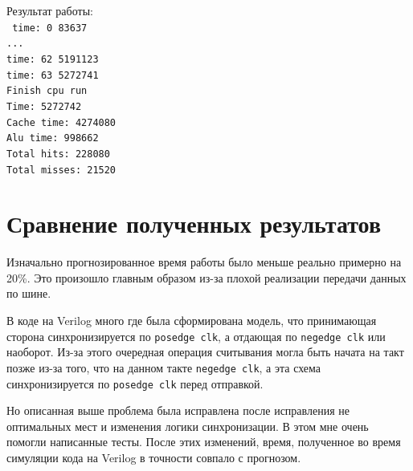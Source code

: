 \documentclass[14pt, russian, onesize]{extreport}
\begin{document}

Результат работы:\\
\texttt{
time:           0                83637\\
...\\
time:          62              5191123\\
time:          63              5272741\\
Finish cpu run                        \\
Time:              5272742            \\
Cache time:              4274080      \\
Alu time:               998662        \\
Total hits:      228080               \\
Total misses:       21520             \\
}

\section*{ Сравнение полученных результатов }
Изначально прогнозированное время работы было меньше реально примерно на 20\%.
Это произошло главным образом из-за плохой реализации передачи данных по шине. 

В коде на Verilog много где была сформирована модель, что
принимающая сторона синхронизируется по \texttt{posedge clk},
а отдающая по \texttt{negedge clk} или наоборот.
Из-за этого очередная операция считывания могла быть начата
на такт позже из-за того, что на данном такте \texttt{negedge clk},
а эта схема синхронизируется по \texttt{posedge clk} перед отправкой.

Но описанная выше проблема была исправлена после исправления не оптимальных мест
и изменения логики синхронизации. В этом мне очень помогли написанные тесты.
После этих изменений, время, полученное во время
симуляции кода на Verilog в точности совпало с прогнозом.
\end{document}
